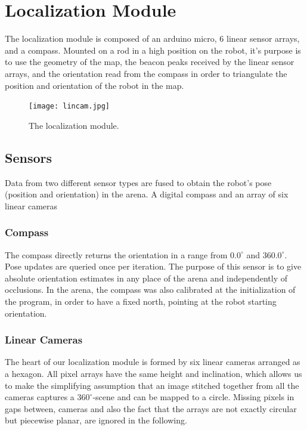 %
%   
%

\section{Localization Module}
The localization module is composed of an arduino micro, 6 linear sensor arrays, and a compass. Mounted on a rod in a high position on the robot, it's purpose is to use the geometry of the map, the beacon peaks received by the linear sensor arrays, and the orientation read from the compass in order to triangulate the position and orientation of the robot in the map.

\begin{figure}
\centering
\texttt{[image: lincam.jpg]}
\caption{The localization module.}
\label{fig:lincam}
\end{figure}

\subsection{Sensors}
Data from two different sensor types are fused to obtain the robot's pose 
(position and orientation) in the arena. A digital compass and an array of
six linear cameras

\subsubsection{Compass}
The compass directly returns the orientation in a range from $0.0^\circ$ and $360.0^\circ$.
Pose updates are queried once per iteration. The purpose of this sensor is to 
give absolute orientation estimates in any place of the arena and independently of
occlusions. In the arena, the compass was also calibrated at the initialization of the program, in order to have a fixed north, pointing at the robot starting orientation.

\subsubsection{Linear Cameras}
The heart of our localization module is formed by six linear cameras arranged 
as a hexagon. All pixel arrays have the same height and inclination, which allows
us to make the simplifying assumption that an image stitched together from all the
cameras captures a $360^\circ$-scene and can be mapped to a circle. Missing pixels
in gaps between, cameras and also the fact that the arrays are not exactly circular
but piecewise planar, are ignored in the following.

